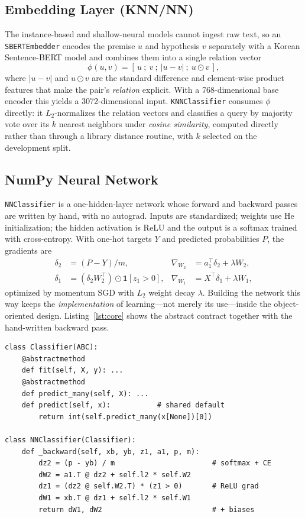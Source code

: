 \documentclass[conference]{IEEEtran}
\begin{document}
\subsection{Embedding Layer (KNN/NN)}
The instance-based and shallow-neural models cannot ingest raw text, so
an \texttt{SBERTEmbedder} encodes the premise $u$ and hypothesis $v$
separately with a Korean Sentence-BERT model and combines them into a
single relation vector
\begin{equation}
\phi(u,v) = [\,u\ ;\ v\ ;\ |u-v|\ ;\ u\odot v\,],
\end{equation}
where $|u-v|$ and $u\odot v$ are the standard difference and
element-wise product features that make the pair's \emph{relation}
explicit. With a 768-dimensional base encoder this yields a
3072-dimensional input. \texttt{KNNClassifier} consumes $\phi$ directly:
it $L_2$-normalizes the relation vectors and classifies a query by
majority vote over its $k$ nearest neighbors under \emph{cosine
similarity}, computed directly rather than through a library distance
routine, with $k$ selected on the development split.

\subsection{NumPy Neural Network}
\texttt{NNClassifier} is a one-hidden-layer network whose forward and
backward passes are written by hand, with no autograd. Inputs are
standardized; weights use He initialization; the hidden activation is
ReLU and the output is a softmax trained with cross-entropy. With
one-hot targets $Y$ and predicted probabilities $P$, the gradients are
\begin{align}
\delta_2 &= (P-Y)/m, &
\nabla_{W_2} &= a_1^{\top}\delta_2 + \lambda W_2, \\
\delta_1 &= (\delta_2 W_2^{\top})\odot \mathbf{1}[z_1>0], &
\nabla_{W_1} &= X^{\top}\delta_1 + \lambda W_1,
\end{align}
optimized by momentum SGD with $L_2$ weight decay $\lambda$. Building
the network this way keeps the \emph{implementation} of learning---not
merely its use---inside the object-oriented design. Listing~\ref{lst:core}
shows the abstract contract together with the hand-written backward pass.

\begin{lstlisting}[caption={Core implementation: the abstract
\texttt{Classifier} contract and the from-scratch backward pass of
\texttt{NNClassifier}.}, label={lst:core}]
class Classifier(ABC):
    @abstractmethod
    def fit(self, X, y): ...
    @abstractmethod
    def predict_many(self, X): ...
    def predict(self, x):           # shared default
        return int(self.predict_many(x[None])[0])

class NNClassifier(Classifier):
    def _backward(self, xb, yb, z1, a1, p, m):
        dz2 = (p - yb) / m                       # softmax + CE
        dW2 = a1.T @ dz2 + self.l2 * self.W2
        dz1 = (dz2 @ self.W2.T) * (z1 > 0)       # ReLU grad
        dW1 = xb.T @ dz1 + self.l2 * self.W1
        return dW1, dW2                          # + biases
\end{lstlisting}
\end{document}
